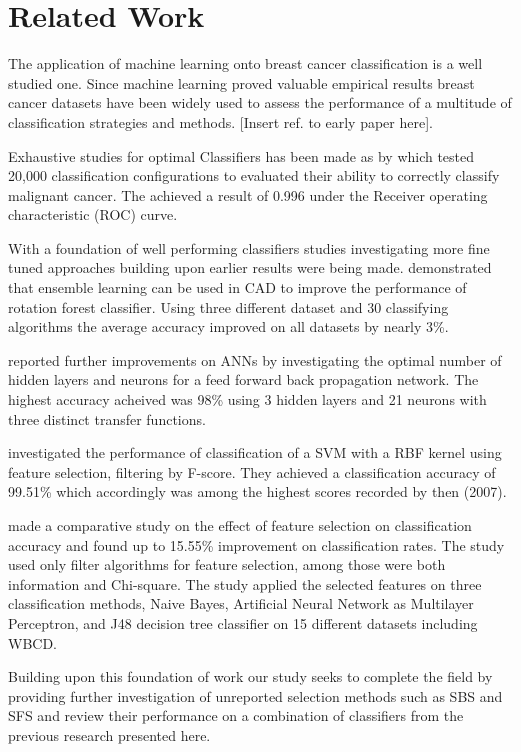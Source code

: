 \section{Related Work}

The application of machine learning onto breast cancer classification is a well studied one. Since machine learning proved valuable empirical results breast cancer datasets have been widely used to assess the performance of a multitude of classification strategies and methods. [Insert ref. to early paper here].

Exhaustive studies for optimal Classifiers has been made as by \parencite{ramos2012} which tested 20,000 classification configurations to evaluated their ability to correctly classify malignant cancer. The achieved a result of 0.996 under the Receiver operating characteristic (ROC) curve.

With a foundation of well performing classifiers studies investigating more fine tuned approaches building upon earlier results were being made. \textcite{akin2011} demonstrated that ensemble learning can be used in CAD to improve the performance of rotation forest classifier. Using three different dataset and 30 classifying algorithms the average accuracy improved on all datasets by nearly 3\%.

\textcite{Abdel-Ilah2017} reported further improvements on ANNs by investigating the optimal number of hidden layers and neurons for a feed forward back propagation network. The highest accuracy acheived was 98\% using 3 hidden layers and 21 neurons with three distinct transfer functions.

\textcite{akay2009} investigated the performance of classification of a SVM with a RBF kernel using feature selection, filtering by F-score. They achieved a classification accuracy of 99.51\% which accordingly was among the highest scores recorded by then (2007).

\textcite{karabulut2012} made a comparative study on the effect of feature selection on classification accuracy and found up to 15.55\% improvement on classification rates. The study used only filter algorithms for feature selection, among those were both information and Chi-square. The study applied the selected features on three classification methods, Naive Bayes, Artificial Neural Network as Multilayer Perceptron, and J48 decision tree classifier on 15 different datasets including WBCD.

Building upon this foundation of work our study seeks to complete the field by providing further investigation of unreported selection methods such as SBS and SFS and review their performance on a combination of classifiers from the previous research presented here.
